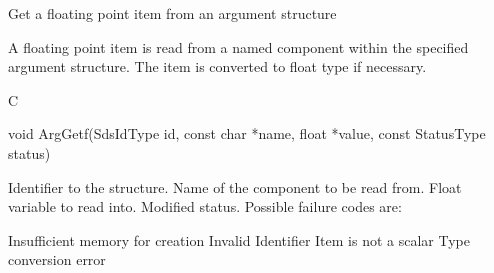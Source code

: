\begin{manroutinedescription}
      Get a floating point item from an argument structure

      A floating point item is read from a named component within the
      specified argument structure. The item is converted to float
      type if necessary.
 
      C

      void ArgGetf(SdsIdType id, const char *name, float *value, const %
StatusType {\mantt{*}}  status)
 
\begin{manparametertable}
 Identifier to the structure.
 Name of the component to be read %
from.
 Float variable to read into.
 Modified status. Possible %
failure codes are:
\end{manparametertable}
\begin{mantwocolumntable}
Insufficient memory for creation
Invalid Identifier
Item is not a scalar
Type conversion error
\end{mantwocolumntable}
\end{manroutinedescription}
